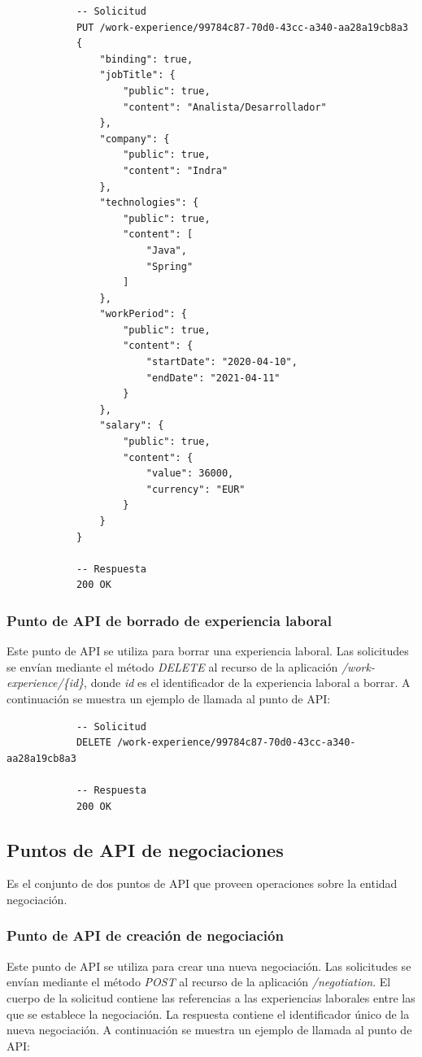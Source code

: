 \documentclass[a4paper, 12pt]{book}
\begin{document}
        {\scriptsize
    \linespread{1}
    \begin{verbatim}
			-- Solicitud
			PUT /work-experience/99784c87-70d0-43cc-a340-aa28a19cb8a3
			{
			    "binding": true,
			    "jobTitle": {
			        "public": true,
			        "content": "Analista/Desarrollador"
			    },
			    "company": {
			        "public": true,
			        "content": "Indra"
			    },
			    "technologies": {
			        "public": true,
			        "content": [
			            "Java",
			            "Spring"
			        ]
			    },
			    "workPeriod": {
			        "public": true,
			        "content": {
			            "startDate": "2020-04-10",
			            "endDate": "2021-04-11"
			        }
			    },
			    "salary": {
			        "public": true,
			        "content": {
			            "value": 36000,
			            "currency": "EUR"
			        }
			    }
			}

			-- Respuesta
			200 OK
    \end{verbatim}
    }

    \subsubsection{Punto de API de borrado de experiencia laboral}
    \label{subsec:delete_work_experience}
    Este punto de API se utiliza para borrar una experiencia laboral.
    Las solicitudes se envían mediante el método \emph{DELETE} al recurso de la aplicación \emph{/work-experience/\{id\}}, donde \emph{id} es el identificador de la experiencia laboral a borrar.
    A continuación se muestra un ejemplo de llamada al punto de API:

        {\scriptsize
    \linespread{1}
    \begin{verbatim}
			-- Solicitud
			DELETE /work-experience/99784c87-70d0-43cc-a340-aa28a19cb8a3

			-- Respuesta
			200 OK
    \end{verbatim}
    }

    \subsection{Puntos de API de negociaciones}
    \label{subsec:negotiation_endpoints}
    Es el conjunto de dos puntos de API que proveen operaciones sobre la entidad negociación.

    \subsubsection{Punto de API de creación de negociación}
    \label{subsec:post_work_experience}
    Este punto de API se utiliza para crear una nueva negociación.
    Las solicitudes se envían mediante el método \emph{POST} al recurso de la aplicación \emph{/negotiation}.
    El cuerpo de la solicitud contiene las referencias a las experiencias laborales entre las que se establece la negociación.
    La respuesta contiene el identificador único de la nueva negociación.
    A continuación se muestra un ejemplo de llamada al punto de API:
\end{document}

